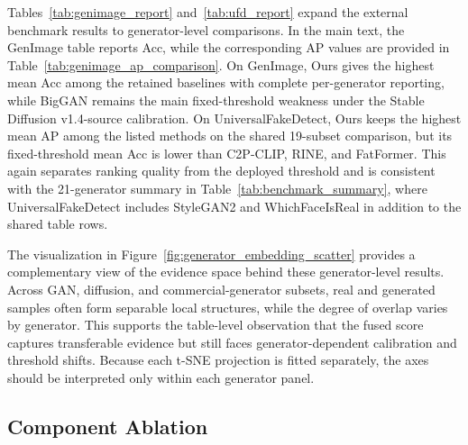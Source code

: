 \documentclass[lettersize,journal]{IEEEtran}
\begin{document}
\clearpage

Tables~\ref{tab:genimage_report} and~\ref{tab:ufd_report} expand the external benchmark results to generator-level comparisons. In the main text, the GenImage table reports Acc, while the corresponding AP values are provided in Table~\ref{tab:genimage_ap_comparison}. On GenImage, Ours gives the highest mean Acc among the retained baselines with complete per-generator reporting, while BigGAN remains the main fixed-threshold weakness under the Stable Diffusion v1.4-source calibration. On UniversalFakeDetect, Ours keeps the highest mean AP among the listed methods on the shared 19-subset comparison, but its fixed-threshold mean Acc is lower than C2P-CLIP, RINE, and FatFormer. This again separates ranking quality from the deployed threshold and is consistent with the 21-generator summary in Table~\ref{tab:benchmark_summary}, where UniversalFakeDetect includes StyleGAN2 and WhichFaceIsReal in addition to the shared table rows.

The visualization in Figure~\ref{fig:generator_embedding_scatter} provides a complementary view of the evidence space behind these generator-level results. Across GAN, diffusion, and commercial-generator subsets, real and generated samples often form separable local structures, while the degree of overlap varies by generator. This supports the table-level observation that the fused score captures transferable evidence but still faces generator-dependent calibration and threshold shifts. Because each t-SNE projection is fitted separately, the axes should be interpreted only within each generator panel.

\subsection{Component Ablation}
\label{sec:ablation_study}
\end{document}
